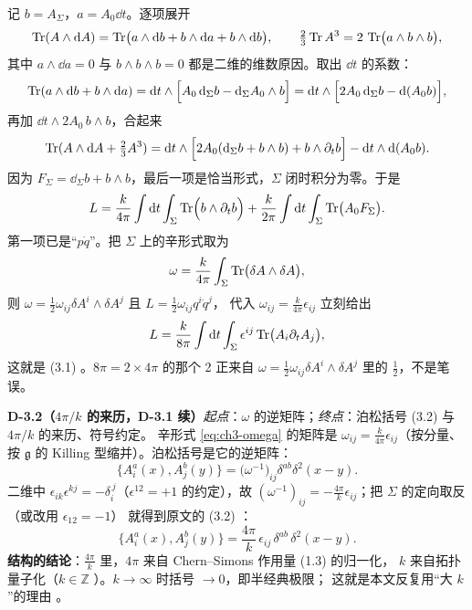 \begin{derivation}[D-3.1：(1.3) 的分解与 $8\pi$ 因子]
记 $b=A_\Sigma$，$a=A_0\dd t$。逐项展开
\begin{equation}
\operatorname{Tr}(A\wedge\mathrm{d} A)=\operatorname{Tr}\bigl(a\wedge\mathrm{d} b+b\wedge\mathrm{d} a+b\wedge\mathrm{d} b\bigr),\qquad
\tfrac23\operatorname{Tr} A^3=2\,\operatorname{Tr}\bigl(a\wedge b\wedge b\bigr),
\end{equation}
其中 $a\wedge\dd a=0$ 与 $b\wedge b\wedge b=0$ 都是二维的维数原因。取出 $\dd t$ 的系数：
\begin{equation}
\operatorname{Tr}(a\wedge\mathrm{d} b+b\wedge\mathrm{d} a)=\mathrm{d} t\wedge\Bigl[A_0\,\mathrm{d}_\Sigma b-\mathrm{d}_\Sigma A_0\wedge b\Bigr]
=\mathrm{d} t\wedge\Bigl[2A_0\,\mathrm{d}_\Sigma b-\mathrm{d}(A_0b)\Bigr],
\end{equation}
再加 $\dd t\wedge 2A_0\,b\wedge b$，合起来
\begin{equation}
\operatorname{Tr}(A\wedge\mathrm{d} A+\tfrac23A^3)
=\mathrm{d} t\wedge\Bigl[2A_0(\mathrm{d}_\Sigma b+b\wedge b)+b\wedge\partial_tb\Bigr]-\mathrm{d} t\wedge\mathrm{d}(A_0b).
\end{equation}
因为 $F_\Sigma=\dd_\Sigma b+b\wedge b$，最后一项是恰当形式，$\Sigma$ 闭时积分为零。于是
\begin{equation}
L=\frac{k}{4\pi}\int\mathrm{d} t\int_\Sigma\operatorname{Tr}\Bigl(b\wedge\partial_tb\Bigr)
+\frac{k}{2\pi}\int\mathrm{d} t\int_\Sigma\operatorname{Tr}\bigl(A_0F_\Sigma\bigr).
\label{eq:ch3-split}
\end{equation}
第一项已是“$p\dot q$”。把 $\Sigma$ 上的辛形式取为
\begin{equation}
\omega=\frac{k}{4\pi}\int_\Sigma\operatorname{Tr}\bigl(\delta A\wedge\delta A\bigr),
\label{eq:ch3-omega}
\end{equation}
则 $\omega=\tfrac12\omega_{ij}\delta A^i\wedge\delta A^j$ 且 $L=\tfrac12\omega_{ij}q^i\dot q^j$，
代入 $\omega_{ij}=\frac{k}{4\pi}\epsilon_{ij}$ 立刻给出
\begin{equation}
L=\frac{k}{8\pi}\int\mathrm{d} t\int_\Sigma\epsilon^{ij}\operatorname{Tr}\bigl(A_i\partial_tA_j\bigr),
\end{equation}
这就是 (3.1) 。$8\pi=2\times4\pi$ 的那个 2 正来自 $\omega=\frac12\omega_{ij}\delta A^i\wedge\delta A^j$
里的 $\frac12$，不是笔误。
\end{derivation}

\noindent\textbf{D-3.2（$4\pi/k$ 的来历，D-3.1 续）}\quad\emph{起点}：$\omega$ 的逆矩阵；\emph{终点}：泊松括号 (3.2) 与 $4\pi/k$ 的来历、符号约定。
辛形式 \eqref{eq:ch3-omega} 的矩阵是 $\omega_{ij}=\frac{k}{4\pi}\epsilon_{ij}$（按分量、按 $\mathfrak g$
的 Killing 型缩并）。泊松括号是它的逆矩阵：
\begin{equation}
\{A_i^a(x),A_j^b(y)\}=\bigl(\omega^{-1}\bigr)_{ij}\delta^{ab}\delta^2(x-y).
\end{equation}
二维中 $\epsilon_{ik}\epsilon^{kj}=-\delta_i^{\,j}$（$\epsilon^{12}=+1$ 的约定），故
$(\omega^{-1})_{ij}=-\frac{4\pi}{k}\epsilon_{ij}$；把 $\Sigma$ 的定向取反（或改用 $\epsilon_{12}=-1$）
就得到原文的 (3.2) ：
\begin{equation}
\{A_i^a(x),A_j^b(y)\}=\frac{4\pi}{k}\,\epsilon_{ij}\,\delta^{ab}\,\delta^2(x-y).
\end{equation}
\textbf{结构的结论}：$\frac{4\pi}{k}$ 里，$4\pi$ 来自 Chern--Simons 作用量 (1.3) 的归一化，
$k$ 来自拓扑量子化（$k\in\mathbb Z$ ）。$k\to\infty$ 时括号 $\to0$，即半经典极限；
这就是本文反复用``大 $k$''的理由 。

